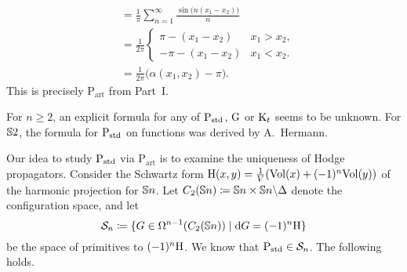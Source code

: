 \documentclass[\MainFolder/Text.tex]{subfiles}
\newcommand{\Soln}{\mathcal{S}}
\newcommand{\ArtPrpg}{\mathrm{P}_{\mathrm{art}}}
\begin{document}
\begin{Example}
\begin{align*}
&= \frac{1}{\pi}\sum_{n=1}^\infty\frac{\sin\bigl(n(x_1-x_2)\bigr)}{n} \\
& = \frac{1}{2\pi} \begin{cases}
\pi - (x_1 - x_2) & x_1 > x_2, \\
-\pi - (x_1-x_2) & x_1< x_2.
\end{cases} \\
& = \frac{1}{2\pi}\bigl(\alpha(x_1,x_2) - \pi\bigr).
\end{align*}
This is precisely $\ArtPrpg$ from Part~I.
\end{Example}

For $n\ge 2$, an explicit formula for any of $\mathrm{P}_{\mathrm{std}}$, $\mathrm{G}$ or $\mathrm{K}_t$ seems to be unknown. For $\mathbb{S}{2}$, the formula for $\mathrm{P}_{\mathrm{std}}$ on functions was derived by A.~Hermann.


Our idea to study $\mathrm{P}_{\mathrm{std}}$ via $\ArtPrpg$ is to examine the uniqueness of Hodge propagators. Consider the Schwartz form $\mathrm{H}(x,y) = \frac{1}{V}(\mathrm{Vol}(x) + (-1)^n\mathrm{Vol}(y))$ of the harmonic projection for $\mathbb{S}{n}$. Let $C_2(\mathbb{S}{n})\coloneqq\mathbb{S}{n}\times\mathbb{S}{n}\backslash\Delta$ denote the configuration space, and let
\begin{equation}\label{Eq:DifEq}
\Soln_n\coloneqq\{\GKer\in\DR^{n-1}(C_2(\Sph{n}))\mid\Dd\GKer=(-1)^n\HKer\}
\end{equation}
be the space of primitives to $(-1)^n\mathrm{H}$. We know that $\StdPrpg\in \Soln_n$. The following holds.
\end{document}
